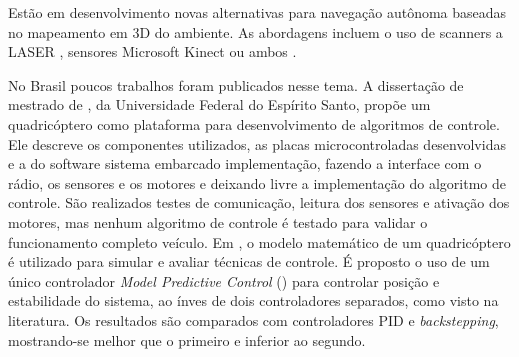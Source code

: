 Estão em desenvolvimento novas alternativas para navegação autônoma baseadas no mapeamento em 3D do ambiente. As abordagens incluem o uso de scanners a LASER \cite{dryanovski11}, sensores Microsoft Kinect \cite{stowers11} ou ambos \cite{shen12}.

No Brasil poucos trabalhos foram publicados nesse tema. A dissertação de mestrado de , da Universidade Federal do Espírito Santo, propõe um quadricóptero como plataforma para desenvolvimento de algoritmos de controle. Ele descreve os componentes utilizados, as placas microcontroladas desenvolvidas e a do software sistema embarcado implementação, fazendo a interface com o rádio, os sensores e os motores e deixando livre a implementação do algoritmo de controle. São realizados testes de comunicação, leitura dos sensores e ativação dos motores, mas nenhum algoritmo de controle é testado para validar o funcionamento completo veículo. Em , o modelo matemático de um quadricóptero é utilizado para simular e avaliar técnicas de controle. É proposto o uso de um único controlador \textit{Model Predictive Control} () para controlar posição e estabilidade do sistema, ao ínves de dois controladores separados, como visto na literatura. Os resultados são comparados com controladores PID e \textit{backstepping}, mostrando-se melhor que o primeiro e inferior ao segundo.